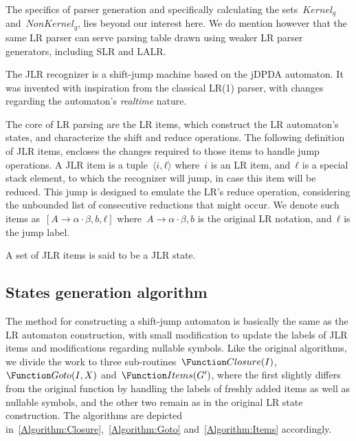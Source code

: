 The specifics of parser generation and specifically
  calculating the sets~$Kernel_{q}$ and~$NonKernel_{q}$, lies beyond our interest here.
We do mention however that the same LR parser can serve parsing table drawn using weaker LR parser generators,
including SLR and LALR\@.

The JLR recognizer is a shift-jump machine
  based on the jDPDA automaton.
It was invented with inspiration from the classical
  LR(1) parser, with changes regarding the automaton's
  \emph{realtime} nature.

The core of LR parsing are the LR items,
  which construct the LR automaton's states, and
  characterize the shift and reduce operations.
The following definition of JLR items,
  encloses the changes required to those items to handle
  jump operations.
A JLR item is a tuple~$⟨i,ℓ⟩$ where~$i$ is an
  LR item, and~$ℓ$ is a special stack element,
  to which the recognizer will jump, in case this item will
  be reduced.
This jump is designed to emulate the LR's
  reduce operation, considering the unbounded list of consecutive
  reductions that might occur.
We denote such items as~$[A→α·β, b ,ℓ]$
  where~$A→α·β, b$ is the original LR notation, and~$ℓ$
  is the jump label.

A set of JLR items is said to be a JLR state.

\subsection{States generation algorithm}
The method for constructing a shift-jump automaton
  is basically the same as the LR automaton construction,
  with small modification to update the labels of JLR items
  and modifications regarding nullable symbols.
Like the original algorithms, we divide the work to three
  sub-routines~$\Function Closure(I)$,~$\Function Goto(I,X)$ and~$\Function Items(G')$,
  where the first slightly differs from the original function by handling the
  labels of freshly added items as well as nullable symbols,
  and the other two remain as in the original LR state construction.
The algorithms are depicted in~\cref{Algorithm:Closure},~\cref{Algorithm:Goto}
  and~\cref{Algorithm:Items} accordingly.


